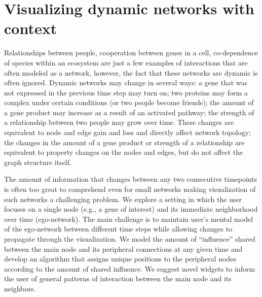 \documentclass[12pt]{cmuthesis}
\begin{document}






\chapter{Visualizing dynamic networks with context}
\label{chapter:mapofjazz}

Relationships between people, cooperation between genes in a cell, co-dependence of species within an ecosystem are just a few examples of interactions that are often modeled as a network, however, the fact that these networks are dynamic is often ignored. Dynamic networks may change in several ways: a gene that was not expressed in the previous time step may turn on; two proteins may form a complex under certain conditions (or two people become friends); the amount of a gene product may increase as a result of an activated pathway; the strength of a relationship between two people may grow over time. These changes are equivalent to node and edge gain and loss and directly affect network topology; the changes in the amount of a gene product or strength of a relationship are equivalent to property changes on the nodes and edges, but do not affect the graph structure itself.

The amount of information that changes between any two consecutive timepoints is often too great to comprehend even for small networks making visualization of such networks a challenging problem. We explore a setting in which the user focuses on a single node (e.g., a gene of interest) and its immediate neighborhood over time (ego-network). The main challenge is to maintain user's mental model of the ego-network between different time steps while allowing changes to propagate through the visualization. We model the amount of ``influence'' shared between the main node and its peripheral connections at any given time and develop an algorithm that assigns unique positions to the peripheral nodes according to the amount of shared influence. We suggest novel widgets to inform the user of general patterns of interaction between the main node and its neighbors.
\end{document}
